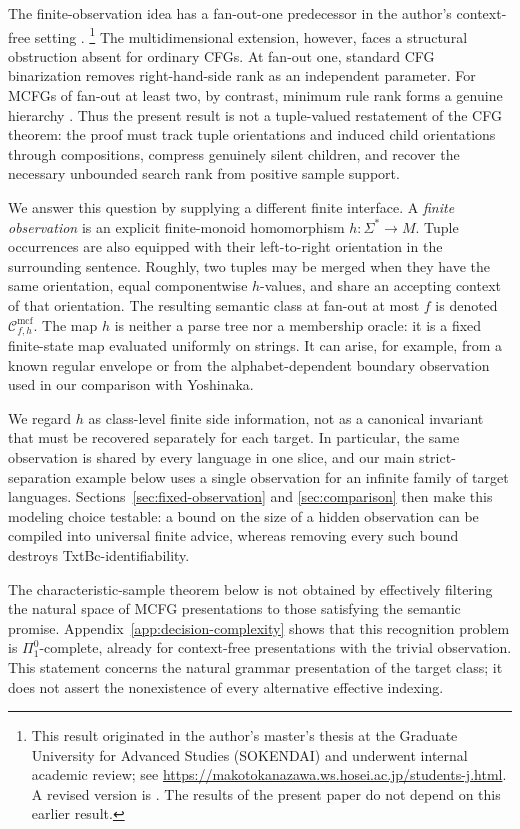 \documentclass[11pt,a4paper]{article}
\numberwithin{equation}{section}
\theoremstyle{plain}
\theoremstyle{definition}
\theoremstyle{remark}
\newcommand{\Cmcf}[2]{\mathcal{C}^{\mathrm{mcf}}_{#1,#2}}
\begin{document}
The finite-observation idea has a fan-out-one predecessor in the author's
context-free setting \cite{kuriyamaCFG}.%
\footnote{This result originated in the author's master's thesis at the
Graduate University for Advanced Studies (SOKENDAI) and underwent internal
academic review; see
\url{https://makotokanazawa.ws.hosei.ac.jp/students-j.html}.  A revised version
is \cite{kuriyamaCFG}.  The results of the present paper do not depend on this
earlier result.}
The multidimensional extension, however, faces a structural obstruction absent
for ordinary CFGs.  At fan-out one,
standard CFG binarization removes right-hand-side rank as an independent
parameter.  For MCFGs of fan-out at least two, by contrast, minimum rule rank
forms a genuine hierarchy \cite{RambowSatta1999}.  Thus the
present result is not a tuple-valued restatement of the CFG theorem: the proof
must track tuple orientations and induced child orientations through
compositions, compress genuinely silent children, and recover the necessary
unbounded search rank from positive sample support.

We answer this question by supplying a different finite interface.  A
\emph{finite observation} is an explicit finite-monoid homomorphism
$h:\Sigma^*\to M$.  Tuple occurrences are also equipped with their
left-to-right orientation in the surrounding sentence.  Roughly, two tuples
may be merged when they have the same orientation, equal componentwise
$h$-values, and share an accepting context of that orientation.  The resulting
semantic class at fan-out at most $f$ is denoted $\Cmcf{f}{h}$.  The map $h$
is neither a parse tree nor a membership oracle: it is a fixed finite-state
map evaluated uniformly on strings.  It can arise, for example, from a known
regular envelope or from the alphabet-dependent boundary observation used in
our comparison with Yoshinaka.

We regard $h$ as class-level finite side information, not as a canonical
invariant that must be recovered separately for each target.  In particular,
the same observation is shared by every language in one slice, and our main
strict-separation example below uses a single observation for an infinite
family of target languages.  Sections~\ref{sec:fixed-observation} and
\ref{sec:comparison} then make this modeling choice testable: a bound on the
size of a hidden observation can be compiled into universal finite advice,
whereas removing every such bound destroys TxtBc-identifiability.

The characteristic-sample theorem below is not obtained by effectively
filtering the natural space of MCFG presentations to those satisfying the
semantic promise.  Appendix~\ref{app:decision-complexity} shows that this
recognition problem is $\Pi^0_1$-complete, already for context-free
presentations with the trivial observation.  This statement concerns the
natural grammar presentation of the target class; it does not assert the
nonexistence of every alternative effective indexing.
\end{document}
